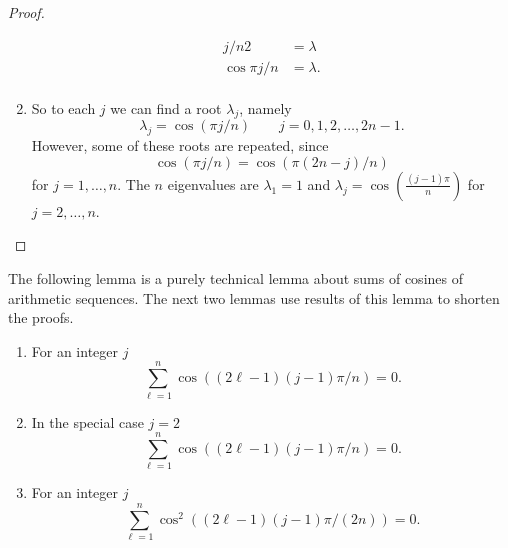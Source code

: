 \documentclass[12pt]{article}
\begin{document}
\begin{proof}
\begin{enumerate}
\begin{align*}
{{                j/n}}{2} &= \lambda \\
                \cos{\pi j/n } &= \lambda.  \\
            \end{align*}
        \item
            So to each \( j \) we can find a root \( \lambda_j \),
            namely
            \[
                \lambda_j = \cos( \pi j/n ) \qquad j = 0,1,2, \dots,
                2n-1.
            \] However, some of these roots are repeated, since
            \[
                \cos( \pi j/n ) = \cos( \pi (2n-j)/n )
            \] for \( j = 1, \dots, n \).  The \( n \)
            eigenvalues are \( \lambda_1 = 1 \) and \( \lambda_j = \cos\left
            ( \frac{(j-1) \pi}{n} \right) \) for \( j=2, \dots, n \).
    \end{enumerate}
\end{proof}

\begin{remark}
    The following lemma is a purely technical lemma about sums of
    cosines of arithmetic sequences.  The next two lemmas use results of
    this lemma to shorten the proofs.
\end{remark}

\begin{lemma}
    \label{fastestmixing:lemma:cossum}
    \begin{enumerate}
        \item
            For an integer \( j \)
            \[
                \sum_{\ell=1}^{n} \cos((2 \ell-1)(j-1)\pi/n) = 0.
            \]
        \item
            In the special case \( j=2 \)
            \[
                \sum_{\ell=1}^{n} \cos((2 \ell-1)(j-1)\pi/n) = 0.
            \]
        \item
            For an integer \( j \)
            \[
                \sum_{\ell=1}^{n} \cos^2((2 \ell-1)(j-1)\pi/(2n)) = 0.
            \]
    \end{enumerate}
\end{lemma}
\end{document}
